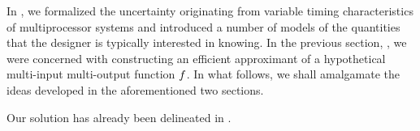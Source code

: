 In , we formalized the uncertainty originating from variable
timing characteristics of multiprocessor systems and introduced a number of
models of the quantities that the designer is typically interested in knowing.
In the previous section, , we were concerned with
constructing an efficient approximant of a hypothetical multi-input multi-output
function $f$. In what follows, we shall amalgamate the ideas developed in the
aforementioned two sections.

Our solution has already been delineated in .
